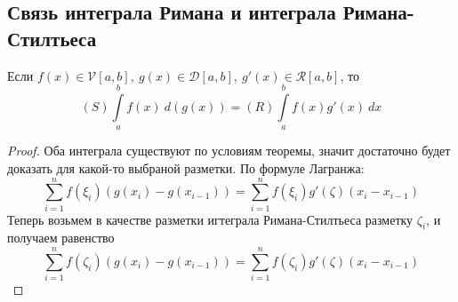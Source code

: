 \subsection{Связь интеграла Римана и интеграла Римана-Стилтьеса}
\begin{theorem}
    Если $f(x)\in \mathcal{V}[a,b],\ g(x)\in \mathcal{D}[a,b],\ g'(x)\in \mathcal{R}[a,b]$, то
    \[(S)\int\limits_{a}^{b}f(x)\ d(g(x))=(R)\int\limits_{a}^{b}f(x)g'(x)\ dx\]
\end{theorem} 
\begin{proof}
    Оба интеграла существуют по условиям теоремы, значит достаточно будет доказать для какой-то выбраной разметки. По формуле Лагранжа:
    \[\sum\limits_{i=1}^{n}f(\xi_i)(g(x_i)-g(x_{i-1}))=\sum\limits_{i=1}^{n}f(\xi_i)g'(\zeta)(x_i-x_{i-1})\]
    Теперь возьмем в качестве разметки игтеграла Римана-Стилтьеса разметку $\zeta_i$, и получаем равенство
    \[\sum\limits_{i=1}^{n}f(\zeta_i)(g(x_i)-g(x_{i-1}))=\sum\limits_{i=1}^{n}f(\zeta_i)g'(\zeta)(x_i-x_{i-1})\]
\end{proof} 
